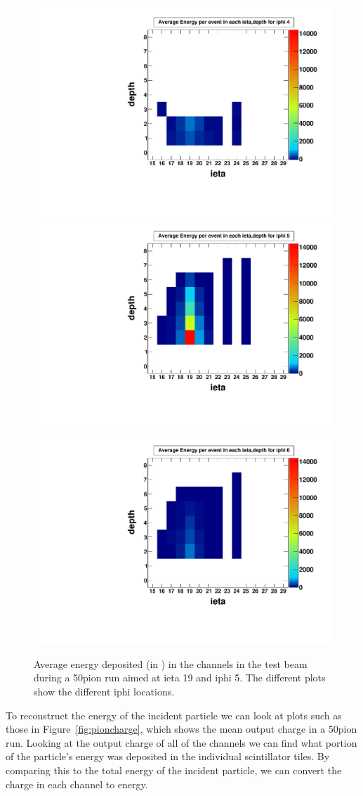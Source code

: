 \begin{figure}
\centering
\includegraphics[width=0.495\linewidth]{Figures/pionrun1.pdf}
\includegraphics[width=0.495\linewidth]{Figures/pionrun.pdf}
\includegraphics[width=0.495\linewidth]{Figures/pionrun2.pdf}
\caption{Average energy deposited (in \MeV) in the channels in the test beam during a 50\GeV\space pion run aimed at ieta 19 and iphi 5. The different plots show the different iphi locations.}
\label{fig:pionmap}
\end{figure}

To reconstruct the energy of the incident particle we can look at plots such as those in Figure~\ref{fig:pioncharge}, which shows the mean output charge in a 50\GeV\space pion run. Looking at the output charge of all of the channels we can find what portion of the particle’s energy was deposited in the individual scintillator tiles. By comparing this to the total energy of the incident particle, we can convert the charge in each channel to energy.

